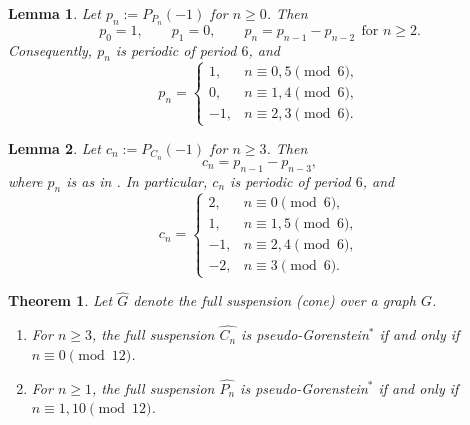 \documentclass[10pt,a4paper]{amsart}
\newtheorem{lem}{Lemma}
\newtheorem{thm}{Theorem}
\begin{document}
\begin{lem}\label{lem:path-minus-one}
Let \(p_n:=P_{P_n}(-1)\) for \(n\ge 0\). Then
\[
p_0=1,\qquad p_1=0,\qquad p_n=p_{n-1}-p_{n-2}\ \ \text{for } n\ge 2.
\]
Consequently, \(p_n\) is periodic of period \(6\), and
\[
p_n=
\begin{cases}
1,& n\equiv 0,5 \pmod 6,\\[4pt]
0,& n\equiv 1,4 \pmod 6,\\[4pt]
-1,& n\equiv 2,3 \pmod 6.
\end{cases}
\]
\end{lem}

\begin{lem}\label{lem:cycle-minus-one}
Let \(c_n:=P_{C_n}(-1)\) for \(n\ge 3\). Then
\[
c_n=p_{n-1}-p_{n-3},
\]
where \(p_n\) is as in . In particular, \(c_n\) is
periodic of period \(6\), and
\[
c_n=
\begin{cases}
2,& n\equiv 0 \pmod 6,\\[4pt]
1,& n\equiv 1,5 \pmod 6,\\[4pt]
-1,& n\equiv 2,4 \pmod 6,\\[4pt]
-2,& n\equiv 3 \pmod 6.
\end{cases}
\]
\end{lem}

\begin{thm}\label{thm:PGstar-full-susp-path-cycle}
Let \(\widehat{G}\) denote the \emph{full suspension} (cone) over a graph \(G\).
\begin{enumerate}
\item[(a)] For \(n\ge 3\), the full suspension \(\widehat{C_n}\) is pseudo-Gorenstein$^{*}$
if and only if \(n\equiv 0 \pmod{12}\).

\item[(b)] For \(n\ge 1\), the full suspension \(\widehat{P_n}\) is pseudo-Gorenstein$^{*}$
if and only if \(n\equiv 1,10 \pmod{12}\).
\end{enumerate}
\end{thm}
\end{document}
